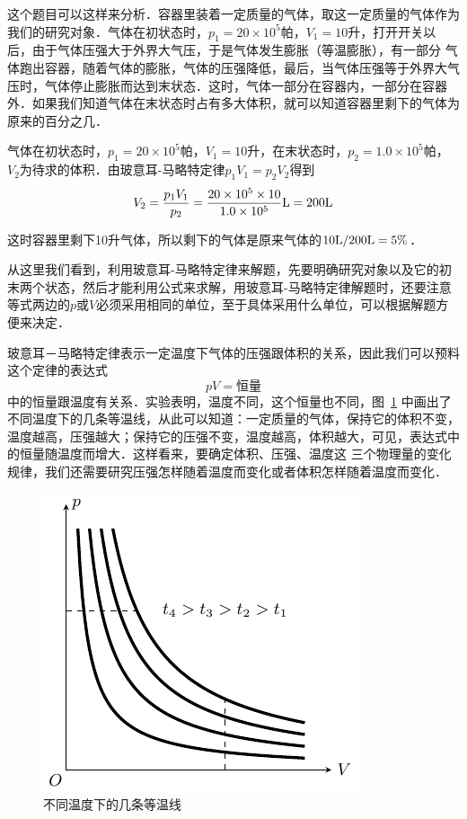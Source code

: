 \begin{solution}
这个题目可以这样来分析．容器里装着一定质量的气体，取这一定质量的气体作为我们的研究对象．气体在初状态时，$p_1=20\times 10^5$帕，$V_1=10$升，打开开关以后，由于气体压强大于外界大气压，于是气体发生膨胀（等温膨胀），有一部分
气体跑出容器，随着气体的膨胀，气体的压强降低，最后，当气体压强等于外界大气压时，气体停止膨胀而达到末状态．这时，气体一部分在容器内，一部分在容器外．如果我们知道气体在末状态时占有多大体积，就可以知道容器里剩下的气体为原来的百分之几．

气体在初状态时，$p_1=20\times 10^5$帕，$V_1=10$升，在末状态时，$p_2=1.0\times 10^5$帕，$V_2$为待求的体积．由玻意耳-马略特定律$p_1V_1=p_2V_2$得到
\[V_2=\frac{p_1V_1}{p_2}=\frac{20\times 10^5\times 10}{1.0\times 10^5}{\rm L}=200{\rm L} \]

这时容器里剩下10升气体，所以剩下的气体是原来气体的$10{\rm L}/200{\rm L}=5\%$．
\end{solution}

从这里我们看到，利用玻意耳-马略特定律来解题，先要明确研究对象以及它的初末两个状态，然后才能利用公式来求解，用玻意耳-马略特定律解题时，还要注意等式两边的$p$或$V$必须采用相同的单位，至于具体采用什么单位，可以根据解题方便来决定．

玻意耳－马略特定律表示一定温度下气体的压强跟体积的关系，因此我们可以预料这个定律的表达式
\[pV=\text{恒量} \]
中的恒量跟温度有关系．实验表明，温度不同，这个恒量也不同，图~\ref{fig_B_3-7} 中画出了不同温度下的几条等温线，从此可以知道：一定质量的气体，保持它的体积不变，温度越高，压强越大；保持它的压强不变，温度越高，体积越大，可见，表达式中的恒量随温度而增大．这样看来，要确定体积、压强、温度这
三个物理量的变化规律，我们还需要研究压强怎样随着温度而变化或者体积怎样随着温度而变化．
\begin{figure}[htbp]
    \centering
    \includegraphics{fig/B/3-7.pdf}
    \caption{不同温度下的几条等温线}\label{fig_B_3-7}
\end{figure}



